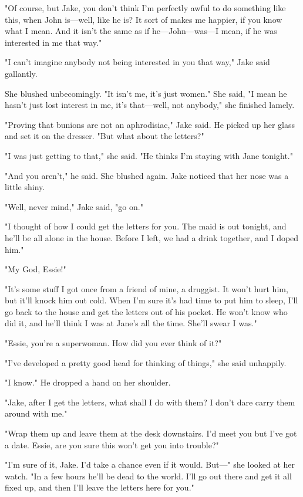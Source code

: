 \documentclass{novel}
\begin{document}
"Of course, but Jake, you don't think I'm perfectly awful to do something like this, when John is—well, like he is? It sort of makes me happier, if you know what I mean. And it isn't the same as if he—John—was—I mean, if he was interested in me that way."

"I can't imagine anybody not being interested in you that way," Jake said gallantly.

She blushed unbecomingly. "It isn't me, it's just women." She said, "I mean he hasn't just lost interest in me, it's that—well, not anybody," she finished lamely.

"Proving that bunions are not an aphrodisiac," Jake said. He picked up her glass and set it on the dresser. "But what about the letters?"

"I was just getting to that," she said. "He thinks I'm staying with Jane tonight."

"And you aren't," he said. She blushed again. Jake noticed that her nose was a little shiny.

"Well, never mind," Jake said, "go on."

"I thought of how I could get the letters for you. The maid is out tonight, and he'll be all alone in the house. Before I left, we had a drink together, and I doped him."

"My God, Essie!"

"It's some stuff I got once from a friend of mine, a druggist. It won't hurt him, but it'll knock him out cold. When I'm sure it's had time to put him to sleep, I'll go back to the house and get the letters out of his pocket. He won't know who did it, and he'll think I was at Jane's all the time. She'll swear I was."

"Essie, you're a superwoman. How did you ever think of it?"

"I've developed a pretty good head for thinking of things," she said unhappily.

"I know." He dropped a hand on her shoulder.

"Jake, after I get the letters, what shall I do with them? I don't dare carry them around with me."

"Wrap them up and leave them at the desk downstairs. I'd meet you but I've got a date. Essie, are you sure this won't get you into trouble?"

"I'm sure of it, Jake. I'd take a chance even if it would. But—" she looked at her watch. "In a few hours he'll be dead to the world. I'll go out there and get it all fixed up, and then I'll leave the letters here for you."
\end{document}
